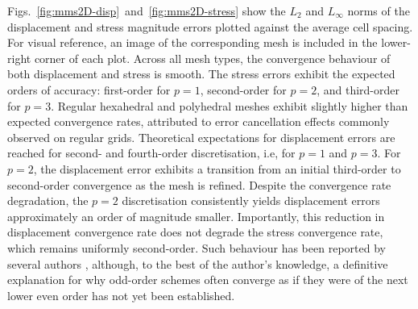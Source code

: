 \documentclass[sn-mathphys,Numbered]{sn-jnl}%
\begin{document}
Figs.~\ref{fig:mms2D-disp}~and~\ref{fig:mms2D-stress} show the $L_2$ and $L_\infty$ norms of the displacement and stress magnitude errors plotted against the average cell spacing. For visual reference, an image of the corresponding mesh is included in the lower-right corner of each plot. Across all mesh types, the convergence behaviour of both displacement and stress is smooth. The stress errors exhibit the expected orders of accuracy: first-order for $p=1$, second-order for $p=2$, and third-order for $p=3$. Regular hexahedral and polyhedral meshes exhibit slightly higher than expected convergence rates, attributed to error cancellation effects commonly observed on regular grids. 
 Theoretical expectations for displacement errors are reached for second- and fourth-order discretisation, i.e, for $p=1$ and $p=3$. For 
$p=2$, the displacement error exhibits a transition from an initial third-order to second-order convergence as the mesh is refined. Despite the convergence rate degradation, the $p=2$ discretisation consistently yields displacement errors approximately an order of magnitude smaller. Importantly, this reduction in displacement convergence rate does not degrade the stress convergence rate, which remains uniformly second-order. Such behaviour has been reported by several authors \cite{Nishikawa2025a}, although, to the best of the author’s knowledge, a definitive explanation for why odd-order schemes often converge as if they were of the next lower even order has not yet been established.
\end{document}
